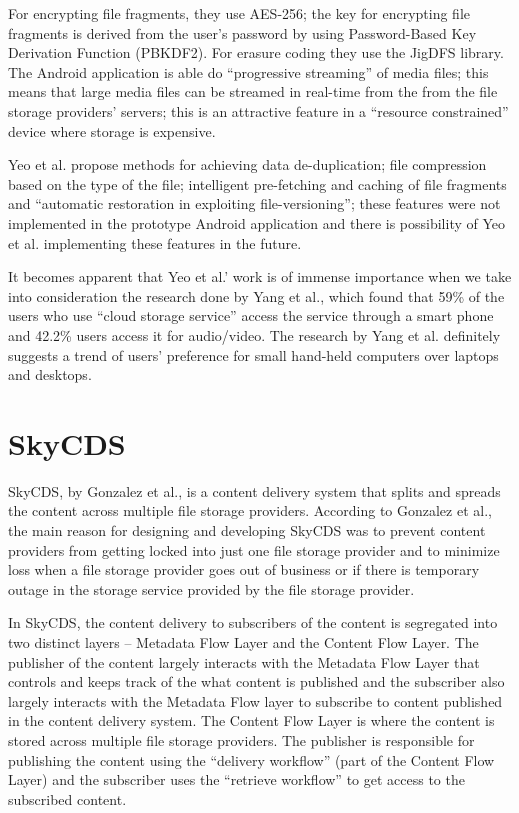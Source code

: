 For encrypting file fragments, they use AES-256; the key for
encrypting file fragments is derived from the user's password by using
Password-Based Key Derivation Function (PBKDF2)\cite{kaliski}. For
erasure coding they use the JigDFS library\cite{jigdfs}. The Android
application is able do ``progressive streaming'' of media files; this
means that large media files can be streamed in real-time from the
from the file storage providers' servers; this is an attractive
feature in a ``resource constrained'' device where storage is
expensive.

Yeo et al. propose methods for achieving data de-duplication; file
compression based on the type of the file; intelligent pre-fetching
and caching of file fragments and ``automatic restoration in
exploiting file-versioning''; these features were not implemented in
the prototype Android application and there is possibility of Yeo et
al. implementing these features in the future.

It becomes apparent that Yeo et al.' work is of immense importance when
we take into consideration the research done by Yang et al., which
found that 59\% of the users who use ``cloud storage service'' access
the service through a smart phone and 42.2\% users access it for
audio/video\cite{yang}. The research by Yang et al. definitely
suggests a trend of users' preference for small hand-held computers
over laptops and desktops.

\section{SkyCDS}\label{2-skycds-sec}

SkyCDS, by Gonzalez et al., is a content delivery system that splits
and spreads the content across multiple file storage
providers\cite{skycds}. According to Gonzalez et al., the main reason
for designing and developing SkyCDS was to prevent content providers
from getting locked into just one file storage provider and to
minimize loss when a file storage provider goes out of business or if
there is temporary outage in the storage service provided by the file
storage provider.

In SkyCDS, the content delivery to subscribers of the content is
segregated into two distinct layers -- Metadata Flow Layer and the
Content Flow Layer. The publisher of the content largely interacts
with the Metadata Flow Layer that controls and keeps track of the what
content is published and the subscriber also largely interacts with
the Metadata Flow layer to subscribe to content published in the
content delivery system. The Content Flow Layer is where the content
is stored across multiple file storage providers. The publisher is
responsible for publishing the content using the ``delivery workflow''
(part of the Content Flow Layer) and the subscriber uses the
``retrieve workflow'' to get access to the subscribed content.

